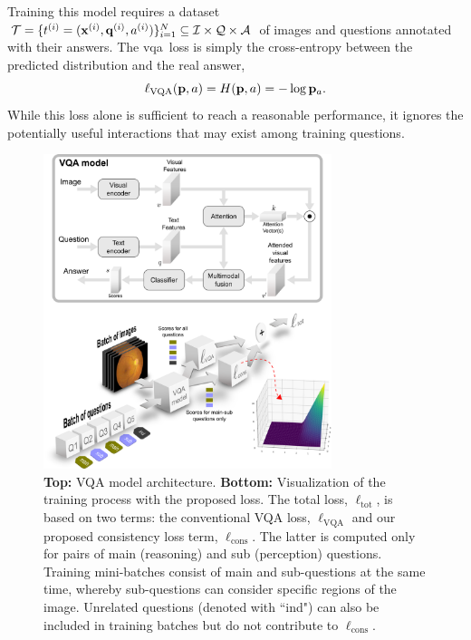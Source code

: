 Training this model requires a dataset~$\mathcal{T}=\{t^{(i)}=(\mathbf{x}^{(i)}, \mathbf{q}^{(i)}, a^{(i)})\}_{i=1}^N\subseteq\mathcal{I}\times\mathcal{Q}\times\mathcal{A}$ of images and questions annotated with their answers. The \gls{vqa}~loss is simply the cross-entropy between the predicted distribution and the real answer,
\begin{equation}
    \label{eq:vqa_loss}
    \ell_{\textrm{VQA}}(\mathbf{p}, a) = H(\mathbf{p}, a) = -\log \mathbf{p}_a.
\end{equation}
While this loss alone is sufficient to reach a reasonable performance, it ignores the potentially useful interactions that may exist among training questions.
\begin{figure}[!h]
\begin{center}
\includegraphics[width=0.75\textwidth]{Figures/Part2_Consist/01_mainsub/method.pdf}
\caption{\textbf{Top:} VQA model architecture. \textbf{Bottom:} Visualization of the training process with the proposed loss. The total loss, $\ell_{\textrm{tot}}$, is based on two terms: the conventional VQA loss,  $\ell_{\textrm{VQA}}$ and our proposed consistency loss term, $\ell_{\textrm{cons}}$. The latter is computed only for pairs of main (reasoning) and sub (perception) questions. Training mini-batches consist of main and sub-questions at the same time, whereby sub-questions can consider specific regions of the image. Unrelated questions (denoted with ``ind") can also be included in training batches but do not contribute to $\ell_{\textrm{cons}}$.}
\label{fig:method_mainsub}
\end{center}
\end{figure}


